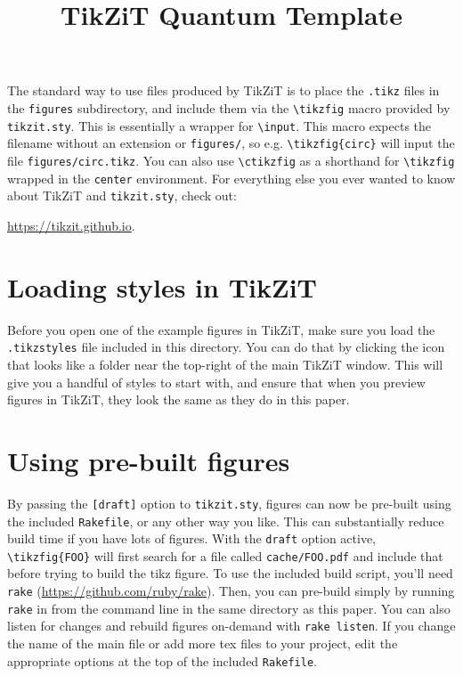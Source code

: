 \documentclass{article}
\title{TikZiT Quantum Template}
\author{}
\begin{document}
\maketitle

The standard way to use files produced by TikZiT is to place the \texttt{.tikz} files in the \texttt{figures} subdirectory, and include them via the \texttt{\textbackslash{}tikzfig} macro provided by \texttt{tikzit.sty}. This is essentially a wrapper for \texttt{\textbackslash{}input}. This macro expects the filename without an extension or \texttt{figures/}, so e.g. \texttt{\textbackslash{}tikzfig\{circ\}} will input the file \texttt{figures/circ.tikz}. You can also use \texttt{\textbackslash{}ctikzfig} as a shorthand for \texttt{\textbackslash{}tikzfig} wrapped in the \texttt{center} environment. For everything else you ever wanted to know about TikZiT and \texttt{tikzit.sty}, check out:

\begin{center}
  \color{blue} \url{https://tikzit.github.io}.
\end{center}

\section*{Loading styles in TikZiT}

Before you open one of the example figures in TikZiT, make sure you load the \texttt{.tikzstyles} file included in this directory. You can do that by clicking the icon that looks like a folder near the top-right of the main TikZiT window. This will give you a handful of styles to start with, and ensure that when you preview figures in TikZiT, they look the same as they do in this paper.

\section*{Using pre-built figures}

By passing the \texttt{[draft]} option to \texttt{tikzit.sty}, figures can now be pre-built using the included \texttt{Rakefile}, or any other way you like. This can substantially reduce build time if you have lots of figures. With the \texttt{draft} option active, \texttt{\textbackslash{}tikzfig\{FOO\}} will first search for a file called \texttt{cache/FOO.pdf} and include that before trying to build the tikz figure. To use the included build script, you'll need \texttt{rake} (\url{https://github.com/ruby/rake}). Then, you can pre-build simply by running \texttt{rake} in from the command line in the same directory as this paper. You can also listen for changes and rebuild figures on-demand with \texttt{rake listen}. If you change the name of the main file or add more tex files to your project, edit the appropriate options at the top of the included \texttt{Rakefile}.
\end{document}
